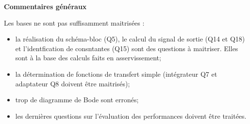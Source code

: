 \documentclass[10pt,fleqn]{article} %
\begin{document}

\pagestyle{fancy}
\thispagestyle{plain}


\def\columnseprulecolor{\color{ocre}}
\setlength{\columnseprule}{0.4pt} 



\vspace{6cm}


\textbf{Commentaires généraux}

Les bases ne sont pas suffisamment maitrisées : 
\begin{itemize}
\item la réalisation du schéma-bloc (Q5), le calcul du signal de sortie (Q14 et Q18) et l'identfication de consntantes (Q15) sont des questions à maitriser. Elles sont à la base des calculs faits en asservissement;
\item la détermination de fonctions de transfert simple (intégrateur Q7 et adaptateur Q8 doivent être maitrisés); 
\item trop de diagramme de Bode sont erronés;
\item les dernières questions sur l'évaluation des performances doivent être traitées. 
\end{itemize}
\vspace{.5cm}



%
\end{document}
